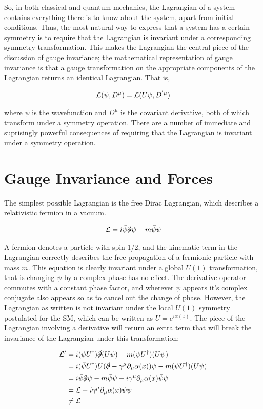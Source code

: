 So, in both classical and quantum mechanics, the Lagrangian of a system contains everything there is to know about the system, apart from initial conditions. 
Thus, the most natural way to express that a system has a certain symmetry is to require that the Lagrangian is invariant under a corresponding symmetry transformation. 
This makes the Lagrangian the central  piece of the discussion of gauge invariance; the mathematical representation of gauge invariance is that a gauge transformation on the appropriate components of the Lagrangian  returns an identical Lagrangian. That is,

\begin{align}
\mathcal{L}(\psi,D^{\mu}) = \mathcal{L}(U\psi, D^{'\mu})
\end{align}

\noindent where $\psi$ is the wavefunction and $D^{\mu}$ is the covariant derivative, both of which transform under a symmetry operation.
There are a number of immediate and suprisingly powerful consequences of requiring that the Lagrangian is invariant under a symmetry operation.

\section{Gauge Invariance and Forces}

The simplest possible Lagrangian is the free Dirac Lagrangian, which describes a relativistic fermion in a vacuum.

\begin{align}\label{eq:free_dirac} 
\mathcal{L} = i\bar{\psi}\slashed{\partial}\psi -m\bar{\psi}\psi 
\end{align}

\noindent A fermion denotes a particle with spin-1/2, and the kinematic term in the Lagrangian correctly describes the free propagation of a fermionic particle with mass $m$. 
This equation is clearly invariant under a global $U(1)$ transformation, that is changing $\psi$ by a complex phase has no effect. 
The derivative operator commutes with a constant phase factor, and wherever $\psi$ appears it's complex conjugate also appears so as to cancel out the change of phase. 
However, the Lagrangian as written is not invariant under the local $U(1)$ symmetry postulated for the \ac{SM}, which can be written as $U = e^{i\alpha(x)}$. 
The piece of the Lagrangian involving a derivative will return an extra term that will break the invariance of the Lagrangian under this transformation:

\begin{align*}
 \mathcal{L}' &= i (\bar{\psi}U^\dagger)\slashed{\partial}(U\psi) - m(\psi U^\dagger)(U\psi) \\
      &= i (\bar{\psi}U^\dagger) U(\slashed{\partial} - \gamma^\mu \partial_\mu\alpha(x))\psi - m(\psi U^\dagger)(U\psi) \\
      &= i \bar{\psi}\slashed{\partial}\psi -m\bar{\psi}\psi - i\gamma^\mu \partial_\mu\alpha(x)\bar{\psi}\psi  \\
      &= \mathcal{L} -  i\gamma^\mu \partial_\mu\alpha(x)\bar{\psi}\psi \\
      &\neq \mathcal{L} 
\end{align*}

